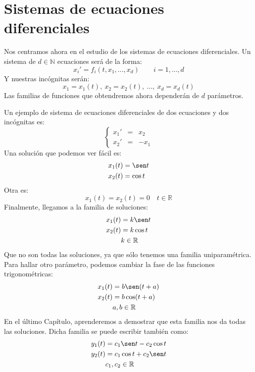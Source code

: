\section{Sistemas de ecuaciones diferenciales}
Nos centramos ahora en el estudio de los sistemas de ecuaciones diferenciales. Un sistema de $d\in \mathbb{N}$ ecuaciones será de la forma:
\begin{equation*}
    x_i' = f_i(t,x_1,\ldots,x_d) \qquad i=1,\ldots, d
\end{equation*}
Y nuestras incógnitas serán:
\begin{equation*}
    x_1 = x_1(t),\ x_2 = x_2(t),\ \ldots,\ x_d = x_d(t)
\end{equation*}
Las familias de funciones que obtendremos ahora dependerán de $d$ parámetros.

\begin{ejemplo}
    Un ejemplo de sistema de ecuaciones diferenciales de dos ecuaciones y dos incógnitas es:
    \begin{equation*}
        \left\{\begin{array}{rcl}
                x_1' &=& x_2 \\
                x_2' &=& -x_1
        \end{array}\right.
    \end{equation*}
    Una solución que podemos ver fácil es:
    \begin{align*}
        x_1(t) &= \sen t \\
        x_2(t) &= \cos t
    \end{align*}
    Otra es:
    \begin{equation*}
        x_1(t) = x_2(t) = 0 \quad t\in \mathbb{R}
    \end{equation*}
    Finalmente, llegamos a la familia de soluciones:
    \begin{align*}
        x_1(t) &= k \sen t \\
        x_2(t) &= k \cos t \\
               &k \in \mathbb{R}
    \end{align*}
    Que no son todas las soluciones, ya que sólo tenemos una familia uniparamétrica. Para hallar otro parámetro, podemos cambiar la fase de las funciones trigonométricas:
    \begin{align*}
        x_1(t) &= b \sen (t+a) \\
        x_2(t) &= b \cos (t+a) \\
               &a,b \in \mathbb{R}
    \end{align*}
    En el último Capítulo, aprenderemos a demostrar que esta familia nos da todas las soluciones. Dicha familia se puede escribir también como:
    \begin{align*}
        y_1(t) &= c_1 \sen t - c_2 \cos t \\
        y_2(t) &= c_1 \cos t + c_2 \sen t \\
               & c_1, c_2 \in \mathbb{R}
    \end{align*}
\end{ejemplo}

